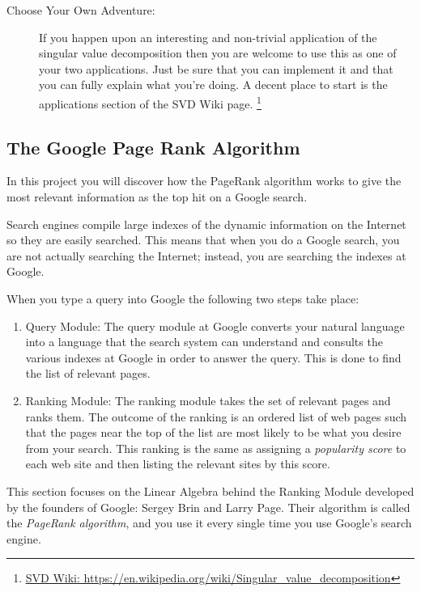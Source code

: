 \begin{description}
    \item[Choose Your Own Adventure:] If you happen upon an interesting and non-trivial
        application of the singular value decomposition then you are welcome to use this
        as one of your two applications.  Just be sure that you can implement it 
        and that you can fully explain what you're doing. A decent place to start is the
        applications section of the SVD Wiki page.
        \footnote{\href{https://en.wikipedia.org/wiki/Singular_value_decomposition}{SVD
            Wiki:
        https://en.wikipedia.org/wiki/Singular\_value\_decomposition}}
\end{description}


\newpage\subsection{The Google Page Rank Algorithm}


In this project you will discover how the PageRank algorithm works to give the most relevant
information as the top hit on a Google search.  

Search engines compile large indexes of the dynamic information on the Internet so they
are easily searched.  This means that when you do a Google search, you are not actually
searching the Internet; instead, you are searching the indexes at Google.

When you type a query into Google the following two steps take place:
\begin{enumerate}
    \item Query Module: The query module at Google converts your natural language into a
        language that the search system can understand and consults the various indexes
        at Google in order to answer the query.  This is done to find the list of relevant
        pages.
    \item Ranking Module: The ranking module takes the set of relevant pages and ranks
        them. The outcome of the ranking is an ordered list of web pages such
        that the pages near the top of the list are most likely to be what you desire from
        your search. This ranking is the same as assigning a {\it popularity score} to
        each web site and then listing the relevant sites by this score.  
\end{enumerate}

This section focuses on the Linear Algebra behind the Ranking Module developed by the
founders of Google: Sergey Brin and Larry Page.  Their algorithm is called the
\emph{PageRank algorithm}, and you use it every single time you use Google's search
engine.


